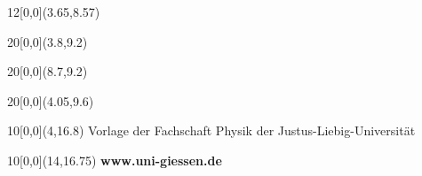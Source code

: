 \begin{titlepage}
    \begin{textblock}{12}[0,0](3.65,8.57)
                     {}
    \end{textblock}
    
    \begin{textblock}{20}[0,0](3.8,9.2)
                     {}
    \end{textblock}
    \begin{textblock}{20}[0,0](8.7,9.2)
                     {}
    \end{textblock}
    
    \begin{textblock}{20}[0,0](4.05,9.6)
    \end{textblock}
    
    
    \begin{textblock}{10}[0,0](4,16.8)
        \tiny{Vorlage der Fachschaft Physik der Justus-Liebig-Universität}
    \end{textblock}
    \begin{textblock}{10}[0,0](14,16.75)
        \large{\textbf{www.uni-giessen.de}}
    \end{textblock}
\end{titlepage}
